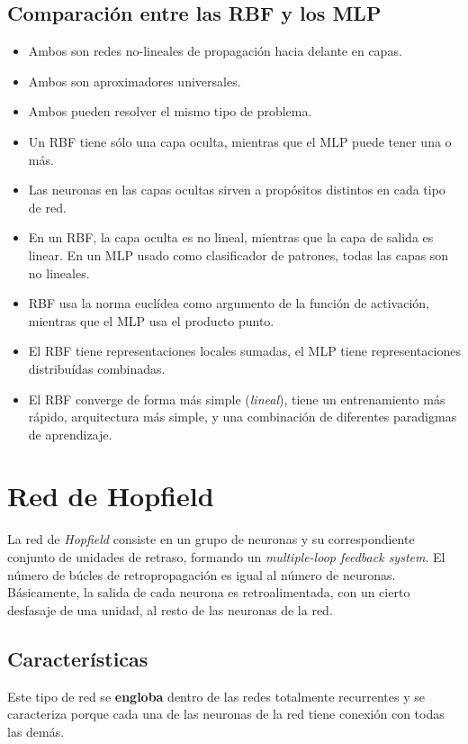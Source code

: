 \documentclass[10pt,a4paper]{article}
\begin{document}
\subsection{Comparación entre las RBF y los MLP}
\begin{itemize}
\item Ambos son redes no-lineales de propagación hacia delante en capas.
\item Ambos son aproximadores universales.
\item Ambos pueden resolver el mismo tipo de problema.
\item Un RBF tiene sólo una capa oculta, mientras que el MLP puede tener una o más.
\item Las neuronas en las capas ocultas sirven a propósitos distintos en cada tipo de red.
\item En un RBF, la capa oculta es no lineal, mientras que la capa de salida es linear. En un MLP usado como clasificador de patrones, todas las capas son no lineales.
\item RBF usa la norma euclídea como argumento de la función de activación, mientras que el MLP usa el producto punto.
\item El RBF tiene representaciones locales sumadas, el MLP tiene representaciones distribuídas combinadas.
\item El RBF converge de forma más simple (\textit{lineal}), tiene un entrenamiento más rápido, arquitectura más simple, y una combinación de diferentes paradigmas de aprendizaje.
\end{itemize}

\section{Red de Hopfield}

La red de \textit{Hopfield} consiste en un grupo de neuronas y su correspondiente conjunto de unidades de retraso, formando un \textit{multiple-loop feedback system}. El número de búcles de retropropagación es igual al número de neuronas. Básicamente, la salida de cada neurona es retroalimentada, con un cierto desfasaje de una unidad, al resto de las neuronas de la red.

\subsection{Características}

Este tipo de red se \textbf{engloba} dentro de las redes totalmente recurrentes y se caracteriza porque cada una de las neuronas de la red tiene conexión con todas las demás.
\end{document}
